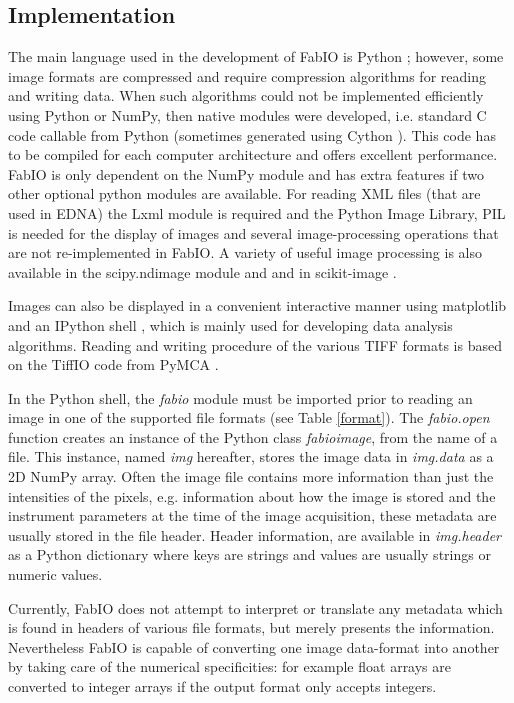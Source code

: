 \documentclass[preprint ]{iucr}
\begin{document}
\subsection{Implementation}
The main language used in the development of FabIO is Python \cite{python};
however, some image formats are compressed and require
compression algorithms for reading and writing data. 
When such algorithms could not be implemented efficiently using Python or NumPy,
then native modules were developed, i.e. standard C code callable from Python 
(sometimes generated using Cython \cite{cython}).
This code has to be compiled for each computer architecture and offers 
excellent performance.
FabIO is only dependent on the NumPy module and has extra features if two other
optional python modules are available. 
For reading XML files (that are used in EDNA) the Lxml \cite{lxml} module is
required and the Python Image Library, PIL \cite{pil} is needed for the display of 
images and several image-processing operations that are not re-implemented 
in FabIO.
A variety of useful image processing is also available in the scipy.ndimage 
module \cite{scipy} and and in scikit-image \cite{skimage}.

Images can also be displayed in a convenient interactive manner using
matplotlib \cite{matplotlib} and an IPython shell \cite{ipython}, which is
mainly used for developing data analysis algorithms.
Reading and writing procedure of the various TIFF \cite{tiff} formats is based
on the TiffIO code from PyMCA \cite{pymca}.

In the Python shell, the {\em fabio} module must be imported prior to reading an
image in one of the supported file formats (see Table \ref{format}).
The {\em fabio.open} function creates an instance of the Python class {\em fabioimage},
from the name of a file. This instance, named {\em img} hereafter, stores the
image data in {\em img.data} as a 2D NumPy array. Often the image file contains
more information than just the intensities of the pixels, e.g.
information about how the image is stored and the instrument parameters at the
time of the image acquisition, these metadata are usually stored in
the file header.
Header information, are available in {\em img.header} as a Python
dictionary where keys are strings and values are usually strings or
numeric values.

Currently, FabIO does not attempt to interpret or translate any metadata which
is found in headers of various file formats, but merely presents the
information. Nevertheless FabIO is capable of converting one
image data-format into another by taking care of the numerical specificities: 
for example float arrays are converted to integer arrays if the output format only
accepts integers.
\end{document}
